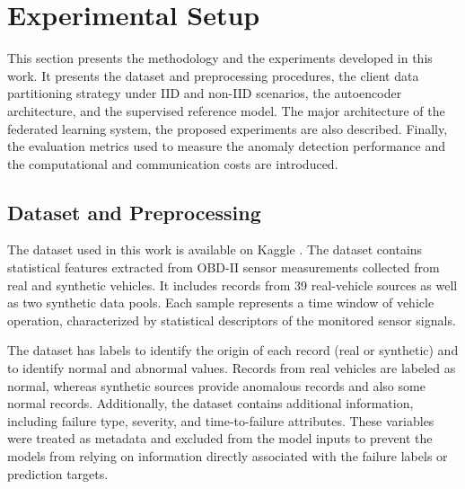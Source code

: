 \documentclass[12pt]{article}
\begin{document}

\section{Experimental Setup}
\label{sec:ExperimentalSetup}

This section presents the methodology and the experiments developed in this work. It presents the dataset and preprocessing procedures, the client data
partitioning strategy under IID and non-IID scenarios, the autoencoder architecture, and the supervised reference model. The major architecture of the federated learning system, the proposed experiments are also described. Finally, the evaluation metrics used to measure the anomaly detection performance and the computational and communication costs are introduced.


\subsection{Dataset and Preprocessing}
\label{subsec:dataset_preprocessing}

The dataset used in this work is available on Kaggle \cite{qasimghumman_obdii_dataset}. The dataset contains statistical features extracted from OBD-II sensor measurements collected from real and synthetic vehicles. It includes records from 39 real-vehicle sources as well as two synthetic data pools. Each sample represents a time window of vehicle operation, characterized by statistical descriptors of the monitored sensor signals. 

The dataset has labels to identify the origin of each record (real or synthetic) and to identify normal and abnormal values. Records from real vehicles are labeled as normal, whereas synthetic sources provide anomalous records and also some normal records. Additionally, the dataset contains additional information, including failure type, severity, and time-to-failure attributes. These variables were treated as metadata and excluded from the model inputs to prevent the models from relying on information directly associated with the failure labels or prediction targets. 
\end{document}
